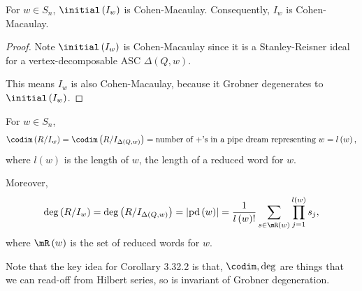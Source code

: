 \documentclass[co439]{subfiles}
\begin{document}
    \rruleline
    
    \begin{cor}{}
        For $w\in S_n$, $\initial\left( I_w \right)$ is Cohen-Macaulay. Consequently, $I_w$ is Cohen-Macaulay.
    \end{cor}	

    \begin{proof}
        Note $\initial\left( I_w \right)$ is Cohen-Macaulay since it is a Stanley-Reisner ideal for a vertex-decomposable ASC $\Delta\left( Q,w \right)$.

        This means $I_w$ is also Cohen-Macaulay, because it Grobner degenerates to $\initial\left( I_w \right)$.
    \end{proof}

    \begin{cor}{}
        For $w\in S_n$, 
        \begin{equation*}
            \codim\left( R /I_w \right) = \codim\left( R /I_{\Delta\left( Q,w \right)} \right) = \text{number of $+$'s in a pipe dream representing $w$} = l\left( w \right),
        \end{equation*}
        where $l\left( w \right)$ is the length of $w$, the length of a reduced word for $w$.

        Moreover,
        \begin{equation*}
            \deg\left( R /I_w \right) = \deg\left( R /I_{\Delta\left( Q,w \right)} \right) = \left| \pd\left( w \right) \right| = \frac{1}{l\left( w \right)!} \sum^{}_{s\in \mR\left( w \right)} \prod^{l\left( w \right)}_{j=1} s_j,
        \end{equation*}
        where $\mR\left( w \right)$ is the set of reduced words for $w$.
    \end{cor}	

    \rruleline

    \np Note that the key idea for Corollary 3.32.2 is that, $\codim,\deg$ are things that we can read-off from Hilbert series, so is invariant of Grobner degeneration.
\end{document}
